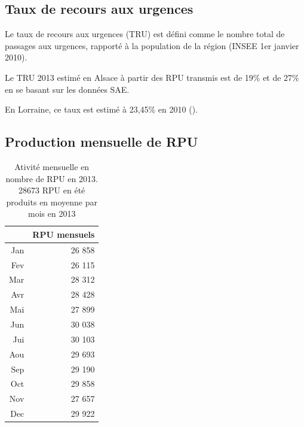 \documentclass[12pt,english,french,twoside]{book}\usepackage[]{graphicx}\usepackage[]{color}
\begin{document}
\subsection*{Taux de recours aux urgences}


Le taux de recours aux urgences  (TRU)  est défini comme le nombre total de passages aux urgences, rapporté à la population de la région (INSEE 1er janvier 2010). 

Le TRU 2013 estimé en Alsace à partir des RPU transmis est de 19\% et de 27\% en se basant sur les données SAE.

En Lorraine, ce taux est estimé à 23,45\% en 2010 (\cite{2,3}). 


\subsection*{Production mensuelle de RPU}

\begin{table}[ht]
\centering
\begin{tabular}{rr}
  \hline
 & RPU mensuels \\ 
  \hline
Jan & 26 858 \\ 
  Fev & 26 115 \\ 
  Mar & 28 312 \\ 
  Avr & 28 428 \\ 
  Mai & 27 899 \\ 
  Jun & 30 038 \\ 
  Jui & 30 103 \\ 
  Aou & 29 693 \\ 
  Sep & 29 190 \\ 
  Oct & 29 858 \\ 
  Nov & 27 657 \\ 
  Dec & 29 922 \\ 
   \hline
\end{tabular}
\caption{Ativité mensuelle en nombre de RPU en 2013. 28673 RPU en été produits en moyenne par mois en 2013} 
\end{table}
\end{document}
